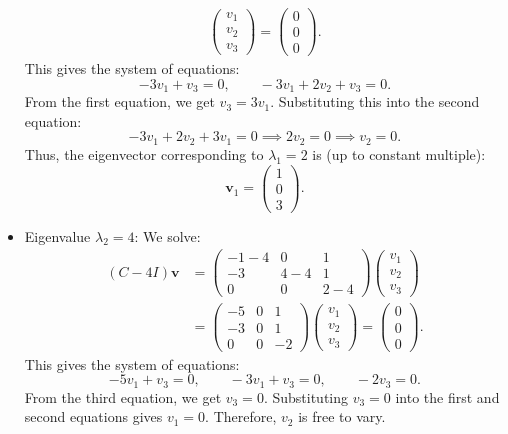 \documentclass[addpoints, 12pt,answers]{exam}
\begin{document}
\begin{questions}
\begin{solution}
\begin{itemize}
\begin{align*}
    \begin{pmatrix} v_1 \\ v_2 \\ v_3 \end{pmatrix} = \begin{pmatrix} 0 \\ 0 \\ 0 \end{pmatrix}.
  \end{align*}
  This gives the system of equations:
  \[ -3v_1 + v_3 = 0, \qquad  -3v_1 + 2v_2 + v_3 = 0. \]
  From the first equation, we get $v_3 = 3v_1$.
  Substituting this into the second equation:
  \[ -3v_1 + 2v_2 + 3v_1 = 0 \implies 2v_2 = 0 \implies v_2 = 0. \]
  Thus, the eigenvector corresponding to $\lambda_1 = 2$ is (up to constant multiple):
  \[ \mathbf{v}_1 = \begin{pmatrix} 1 \\ 0 \\ 3 \end{pmatrix}. \]

  \item {Eigenvalue $\lambda_2 = 4$:}
  We solve:
  \begin{align*}
    (C - 4I) \mathbf{v}
    &= \begin{pmatrix} -1 - 4 & 0 & 1 \\ -3 & 4 - 4 & 1 \\ 0 & 0 & 2 - 4 \end{pmatrix} \begin{pmatrix} v_1 \\ v_2 \\ v_3 \end{pmatrix} \\
    &= \begin{pmatrix} -5 & 0 & 1 \\ -3 & 0 & 1 \\ 0 & 0 & -2 \end{pmatrix} \begin{pmatrix} v_1 \\ v_2 \\ v_3 \end{pmatrix} = \begin{pmatrix} 0 \\ 0 \\ 0 \end{pmatrix}.
  \end{align*}
  This gives the system of equations:
  \[ -5v_1 + v_3 = 0 , \qquad -3v_1 + v_3 = 0, \qquad -2v_3 = 0. \]
  From the third equation, we get $v_3 = 0$.
  Substituting $v_3 = 0$ into the first and second equations gives $v_1 = 0$.
  Therefore, $v_2$ is free to vary.


\end{itemize}
\end{solution}
\end{questions}
\end{document}
